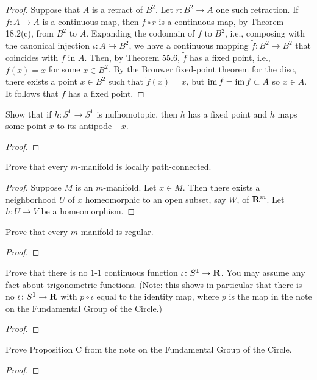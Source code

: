\begin{proof}
Suppose that $A$ is a retract of $B^2$. Let $r\colon B^2\to A$ one such
retraction. If $f\colon A\to A$ is a continuous map, then $f\circ r$ is a
continuous map, by Theorem 18.2(c), from $B^2$ to $A$. Expanding the
codomain of $f$ to $B^2$, i.e., composing with the canonical injection
$\iota\colon A\hookrightarrow B^2$, we have a continuous mapping
$\tilde{f}\colon B^2\to B^2$ that coincides with $f$ in $A$. Then, by
Theorem 55.6, $\tilde f$ has a fixed point, i.e., $\tilde{f}(x)=x$ for some
$x\in B^2$. By the Brouwer fixed-point theorem for the disc, there exists a
point $x\in B^2$ such that $\tilde{f}(x)=x$, but $\operatorname{im}{\tilde{f}}=\operatorname{im}
f\subset A$ so $x\in A$. It follows that $f$ has a fixed point.
\end{proof}
\newpage
\begin{problem}[Munkres \S55, Ex.\,2]
Show that if $h\colon S^1\to S^1$ is nulhomotopic, then $h$ has a
fixed point and $h$ maps some point $x$ to its antipode $-x$.
\end{problem}
\begin{proof}
\end{proof}
\newpage
\begin{problem}[(A)]
Prove that every $m$-manifold is locally path-connected.
\end{problem}
\begin{proof}
Suppose $M$ is an $m$-manifold. Let $x\in M$. Then there exists a
neighborhood $U$ of $x$ homeomorphic to an open subset, say $W$, of
$\mathbf{R}^m$. Let $h\colon U\to V$ be a homeomorphism.
\end{proof}
\newpage
\begin{problem}[(B)]
Prove that every $m$-manifold is regular.
\end{problem}
\begin{proof}
\end{proof}
\newpage
\begin{problem}[(C)]
Prove that there is no $1$-$1$ continuous function $\iota\colon
S^1\to\mathbf{R}$. You may assume any fact about trigonometric
functions. (Note: this shows in particular that there is no
$\iota\colon S^1\to\mathbf{R}$ with $p\circ\iota$ equal to the identity
map, where $p$ is the map in the note on the Fundamental Group of
the Circle.)
\end{problem}
\begin{proof}
\end{proof}
\newpage
\begin{problem}[(D)]
Prove Proposition C from the note on the Fundamental Group of the Circle.
\end{problem}
\begin{proof}
\end{proof}

